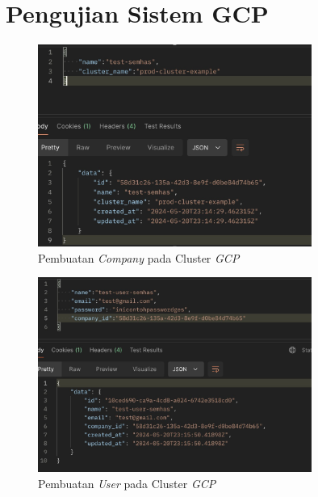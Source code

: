 \chapter{Pengujian Sistem GCP}

\begin{figure}[ht]
  \centering
  \includegraphics[width=0.8\textwidth]{resources/chapter-4/pengujian/pengujian-sistem-gcp-01.jpg}
  \caption{Pembuatan \textit{Company} pada Cluster \textit{GCP}}
  \label{fig:pengujian-sistem-gcp-01}
\end{figure}

\begin{figure}[ht]
  \centering
  \includegraphics[width=0.8\textwidth]{resources/chapter-4/pengujian/pengujian-sistem-gcp-02.jpg}
  \caption{Pembuatan \textit{User} pada Cluster \textit{GCP}}
  \label{fig:pengujian-sistem-gcp-02}
\end{figure}

